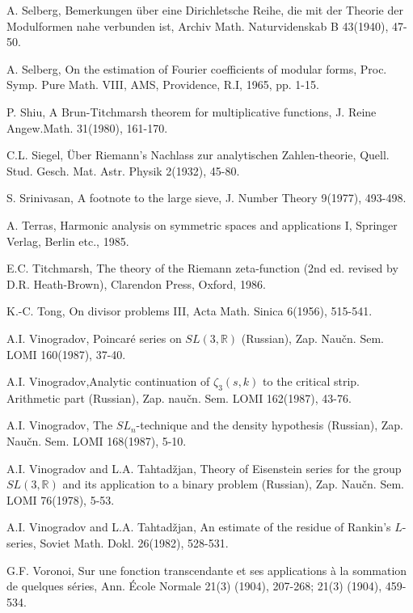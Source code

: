 \begin{thebibliography}{99}
 A. Selberg, Bemerkungen \"uber eine Dirichletsche Reihe, die mit der Theorie der Modulformen nahe verbunden ist, Archiv Math. Naturvidenskab B 43(1940), 47-50.

 A. Selberg, On the estimation of Fourier coefficients of modular forms, Proc. Symp. Pure Math. VIII, AMS, Providence, R.I, 1965, pp. 1-15.

 P. Shiu, A Brun-Titchmarsh theorem for multiplicative functions, J. Reine Angew.Math. 31(1980), 161-170.

 C.L. Siegel, \"Uber Riemann's Nachlass zur analytischen Zahlen-theorie, Quell. Stud. Gesch. Mat. Astr. Physik 2(1932), 45-80.

 S. Srinivasan, A footnote to the  large sieve, J. Number Theory 9(1977), 493-498.

 A. Terras, Harmonic analysis on symmetric spaces and applications I, Springer Verlag, Berlin etc., 1985.

 E.C. Titchmarsh, The theory of the Riemann zeta-function (2nd ed. revised by D.R. Heath-Brown), Clarendon Press, Oxford, 1986.

 K.-C. Tong, On divisor problems III, Acta Math. Sinica 6(1956), 515-541.

 A.I. Vinogradov, Poincar\'e series on $SL(3,\mathbb{R})$ (Russian), Zap. Nau\v cn. Sem. LOMI 160(1987), 37-40.

 A.I. Vinogradov,\pageoriginale Analytic continuation of $\zeta_3(s,k)$ to the critical strip. Arithmetic part (Russian), Zap. nau\v cn. Sem. LOMI 162(1987), 43-76.

 A.I. Vinogradov, The $SL_n$-technique and the density hypothesis (Russian), Zap. Nau\v cn. Sem. LOMI 168(1987), 5-10.

 A.I. Vinogradov and L.A. Tahtad\v zjan, Theory of Eisenstein series for the group $SL(3,\mathbb{R})$ and its application to a binary problem (Russian), Zap. Nau\v cn. Sem. LOMI 76(1978), 5-53.

 A.I. Vinogradov and L.A. Tahtad\v zjan, An estimate of the residue of Rankin's $L$-series, Soviet Math. Dokl. 26(1982), 528-531.

 G.F. Voronoi, Sur une fonction transcendante et ses applications \`a la sommation de quelques s\'eries, Ann. \'Ecole Normale 21(3) (1904), 207-268; 21(3) (1904), 459-534.


\end{thebibliography}
